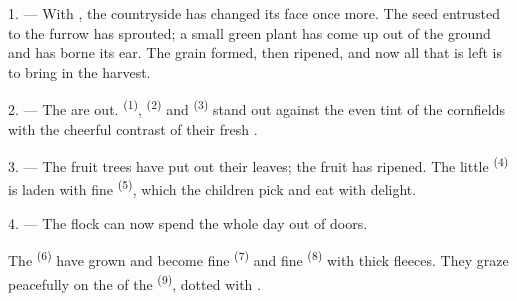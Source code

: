 %


\VUsaut{5.0mm}
\VUsaut{3.0mm}
\VUsaut{3.0mm}
\VUsaut{4.0mm}
\VUsaut{3.0mm}

1. --- With , the countryside has changed its face once more. The seed
entrusted to the furrow has sprouted; a small green plant has come up out of the ground and
has borne its ear. The grain formed, then ripened, and now all that is left is to bring in the
harvest.

2. --- The  are out.  \textsuperscript{(1)},
 \textsuperscript{(2)} and  \textsuperscript{(3)} stand out
against the even tint of the cornfields with the cheerful contrast of their fresh
.

3. --- The fruit trees have put out their leaves; the fruit has ripened. The little
 \textsuperscript{(4)} is laden with fine
 \textsuperscript{(5)}, which the children pick and eat with
delight.

4. --- The flock can now spend the whole day out of doors.

The  \textsuperscript{(6)} have grown and become fine 
\textsuperscript{(7)} and fine  \textsuperscript{(8)} with thick fleeces. They
graze peacefully on the  of the  \textsuperscript{(9)}, dotted
with .

